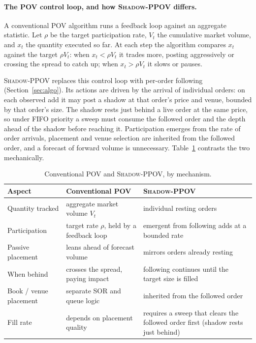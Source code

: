 \documentclass[11pt]{article}
\newcommand{\pov}{\textsc{Shadow-PPOV}}
\begin{document}
\paragraph{The POV control loop, and how \pov{} differs.} A conventional POV
algorithm runs a feedback loop against an aggregate statistic. Let $\rho$ be the
target participation rate, $V_t$ the cumulative market volume, and $x_t$ the
quantity executed so far. At each step the algorithm compares $x_t$ against the
target $\rho V_t$: when $x_t < \rho V_t$ it trades more, posting aggressively or
crossing the spread to catch up; when $x_t > \rho V_t$ it slows or pauses.

\pov{} replaces this control loop with per-order following
(Section~\ref{sec:algo}). Its actions are driven by the arrival of individual
orders: on each observed add it may post a shadow at that order's price and
venue, bounded by that order's size. The shadow rests just behind a live order at
the same price, so under FIFO priority a sweep must consume the followed order
and the depth ahead of the shadow before reaching it. Participation emerges from the rate of
order arrivals, placement and venue selection are inherited from the followed
order, and a forecast of forward volume is unnecessary. Table~\ref{tab:pov}
contrasts the two mechanically.

\begin{table}[h]
\centering
\caption{Conventional POV and \pov{}, by mechanism.}
\label{tab:pov}
\small
\begin{tabular}{p{3.3cm}p{4.7cm}p{4.7cm}}
\toprule
Aspect & Conventional POV & \pov{} \\
\midrule
Quantity tracked & aggregate market volume $V_t$ & individual resting orders \\
\addlinespace
Participation & target rate $\rho$, held by a feedback loop & emergent from following adds at a bounded rate \\
\addlinespace
Passive placement & leans ahead of forecast volume & mirrors orders already resting \\
\addlinespace
When behind & crosses the spread, paying impact & following continues until the target size is filled \\
\addlinespace
Book / venue placement & separate SOR and queue logic & inherited from the followed order \\
\addlinespace
Fill rate & depends on placement quality & requires a sweep that clears the followed order first (shadow rests just behind) \\
\bottomrule
\end{tabular}
\end{table}
\end{document}
